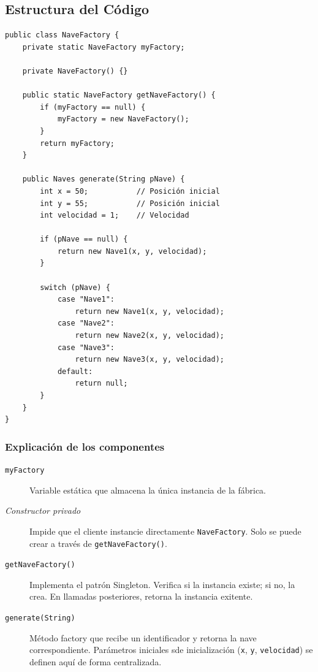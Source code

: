 \documentclass[12pt]{article}
\begin{document}
\subsection{Estructura del Código}

\begin{lstlisting}
public class NaveFactory {
    private static NaveFactory myFactory;
    
    private NaveFactory() {}
    
    public static NaveFactory getNaveFactory() {
        if (myFactory == null) {
            myFactory = new NaveFactory();
        }
        return myFactory;
    }
    
    public Naves generate(String pNave) {
        int x = 50;           // Posición inicial
        int y = 55;           // Posición inicial
        int velocidad = 1;    // Velocidad
        
        if (pNave == null) {
            return new Nave1(x, y, velocidad);
        }
        
        switch (pNave) {
            case "Nave1":
                return new Nave1(x, y, velocidad);
            case "Nave2":
                return new Nave2(x, y, velocidad);
            case "Nave3":
                return new Nave3(x, y, velocidad);
            default:
                return null;
        }
    }
}
\end{lstlisting}

\subsubsection{Explicación de los componentes}

\begin{description}
    \item[\texttt{myFactory}] Variable estática que almacena la única instancia de la fábrica.
    
    \item[\textit{Constructor privado}] Impide que el cliente instancie directamente \texttt{NaveFactory}. Solo se puede crear a través de \texttt{getNaveFactory()}.
    
    \item[\texttt{getNaveFactory()}] Implementa el patrón Singleton. Verifica si la instancia existe; si no, la crea. En llamadas posteriores, retorna la instancia exitente.
    
    \item[\texttt{generate(String)}] Método factory que recibe un identificador y retorna la nave correspondiente. Parámetros iniciales sde inicialización (\texttt{x}, \texttt{y}, \texttt{velocidad}) se definen aquí de forma centralizada.
\end{description}
\end{document}
